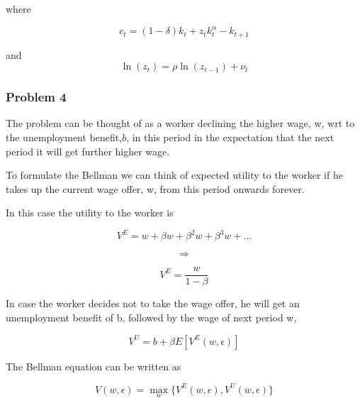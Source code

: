 \documentclass{article}
\begin{document}
where

$$ c_{t} = (1-\delta)k_{t} + z_{t}k_{t}^\alpha - k_{t+1} $$

and
$$ \ln(z_{t}) =  \rho\ln(z_{t-1}) + \nu_{t} $$

\subsubsection*{Problem 4}
The problem can be thought of as a worker declining the higher wage, w, wrt to the unemployment benefit,$b$, in this period in the expectation that the next period it will get further higher wage.

To formulate the Bellman we can think of expected utility to the worker if he takes up the current wage offer, w, from this period onwards forever.

In this case the utility to the worker is

$$ V^E = w + \beta w + \beta^2 w + \beta^3 w + ... $$

$$ \Rightarrow $$

$$ V^E = \frac {w}{1-\beta} $$

In case the worker decides not to take the wage offer, he will get an unemployment benefit of b, followed by the wage of next period w,

$$ V^U = b + \beta E[ V^E ( w, \epsilon)] $$

The Bellman equation can be written as

$$ V(w,\epsilon) = \max_w \{V^E(w,\epsilon), V^U(w,\epsilon)\} $$
\end{document}
